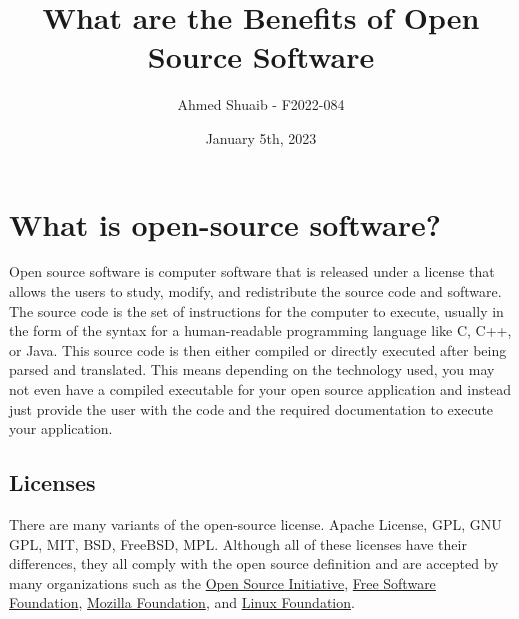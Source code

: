 \documentclass{article}
\title{What are the Benefits of Open Source Software}
\author{Ahmed Shuaib - F2022-084}
\date{January 5th, 2023}
\begin{document}
\maketitle
\pagebreak

\section*{What is open-source software?}
Open source software is computer software that is released under a license that allows the users to study, modify, and redistribute the source code and software. The source code is the set of instructions for the computer to execute, usually in the form of the syntax for a human-readable programming language like C, C++, or Java. This source code is then either compiled or directly executed after being parsed and translated. This means depending on the technology used, you may not even have a compiled executable for your open source application and instead just provide the user with the code and the required documentation to execute your application.

\subsection*{Licenses}
There are many variants of the open-source license. Apache License, GPL, GNU GPL, MIT, BSD, FreeBSD, MPL. Although all of these licenses have their differences, they all comply with the open source definition and are accepted by many organizations such as the
\href{https://opensource.org}{Open Source Initiative}, 
\href{https://www.fsf.org}{Free Software Foundation}, 
\href{https://foundation.mozilla.org}{Mozilla Foundation}, and 
\href{https://www.linuxfoundation.org}{Linux Foundation}.
\end{document}
